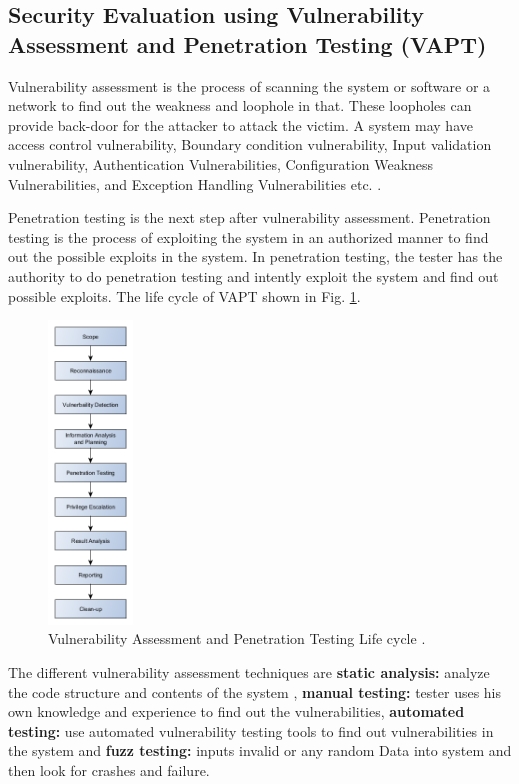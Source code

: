 \documentclass[pdftex,english,oribibl]{llncs}
\begin{document}
\subsection{Security Evaluation using Vulnerability Assessment and Penetration Testing (VAPT)}
Vulnerability assessment is the process of scanning the system or software or a network to find out the weakness and loophole in that. These loopholes can provide back-door for the  attacker to attack the victim. A system may have access control vulnerability, Boundary condition vulnerability, Input validation vulnerability, Authentication Vulnerabilities, Configuration Weakness Vulnerabilities, and Exception Handling Vulnerabilities etc. \cite{GOEL2015710}.

Penetration testing is the next step after vulnerability assessment. Penetration testing is the process of exploiting the system in an authorized manner to find out the possible exploits in the system. In penetration testing, the tester has the authority to do penetration testing and intently exploit the system and find out possible exploits. The life cycle of VAPT shown in Fig. \ref{fig:vapt_lifecycle}.

\begin{figure}[h]
	\centering\includegraphics[width=0.2\textwidth]{figures/vapt_lifecycle.png}
	\caption{Vulnerability Assessment and Penetration Testing Life cycle \cite{GOEL2015710}.}
	\label{fig:vapt_lifecycle}
\end{figure}

The different vulnerability assessment techniques are \textbf{static analysis:} analyze the code structure and contents of the system , \textbf{manual testing:} tester uses his own knowledge and experience to find out the vulnerabilities, \textbf{automated testing:} use automated vulnerability testing tools to find out vulnerabilities in the system and \textbf{fuzz testing:} inputs invalid or any random Data into system and then look for crashes and failure.
\end{document}
